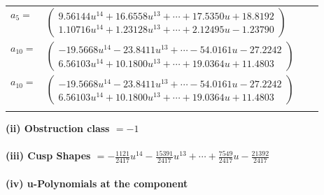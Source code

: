 \documentclass[1p]{elsarticle_modified}
\theoremstyle{definition}
\begin{document}
\begin{tabular}{m{7pt} m{180pt} m{7pt} m{180pt} }
\flushright $a_{5}=$&$\begin{pmatrix}9.56144 u^{14}+16.6558 u^{13}+\cdots+17.5350 u+18.8192\\1.10716 u^{14}+1.23128 u^{13}+\cdots+2.12495 u-1.23790\end{pmatrix}$ \\
\flushright $a_{10}=$&$\begin{pmatrix}-19.5668 u^{14}-23.8411 u^{13}+\cdots-54.0161 u-27.2242\\6.56103 u^{14}+10.1800 u^{13}+\cdots+19.0364 u+11.4803\end{pmatrix}$\\ \flushright $a_{10}=$&$\begin{pmatrix}-19.5668 u^{14}-23.8411 u^{13}+\cdots-54.0161 u-27.2242\\6.56103 u^{14}+10.1800 u^{13}+\cdots+19.0364 u+11.4803\end{pmatrix}$\\&\end{tabular}
\flushleft \textbf{(ii) Obstruction class $= -1$}\\~\\
\flushleft \textbf{(iii) Cusp Shapes $= -\frac{1121}{2417} u^{14}-\frac{15391}{2417} u^{13}+\cdots+\frac{7549}{2417} u-\frac{21392}{2417}$}\\~\\
\newpage\renewcommand{\arraystretch}{1}
\flushleft \textbf{(iv) u-Polynomials at the component}\newline \\
\end{document}
